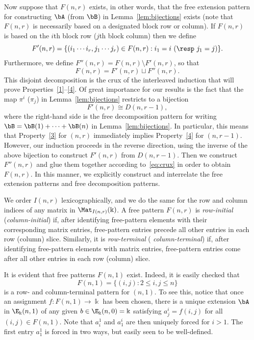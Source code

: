 Now suppose that $F(n,r)$ exists, in other words, that the free
extension pattern for constructing $\bA$ (from $\bB$) in Lemma~\ref{lem:bijections} exists (note that $F(n,r)$ is necessarily based on a designated block row or column). If $F(n,r)$ is based on the
$i$th block row (\resp $j$th block column) then we define 
\begin{equation}\label{eq:F'-def}
 F'(n,r) = \{(i_1 \cdots i_r, j_1 \cdots j_r) \in F(n,r):
 i_1 = i\ (\text{\resp}\ j_1 = j)\}.
\end{equation}
Furthermore, we define $F''(n,r)=F(n,r) \setminus F'(n,r)$, so that
\begin{equation}\label{eq:crux}
F(n,r) = F'(n,r) \sqcup F''(n,r).
\end{equation}
This disjoint decomposition is the crux of the interleaved induction
that will prove Properties~\ref{1}--\ref{4}. Of great importance for
our results is the fact that the map $\pi^i$ (\resp $\pi_j$) in Lemma~\ref{lem:bijections} restricts to a bijection
\[
F'(n,r)\cong D(n,r-1),
\]
where the right-hand side is the free decomposition pattern for writing
$\bB = \bB(1)+ \cdots + \bB(n)$ in Lemma~\ref{lem:bijections}. In
particular, this means that Property~\ref{3} for $(n,r)$ immediately
implies Property~\ref{4} for $(n,r-1)$. However, our induction
proceeds in the reverse direction, using the inverse of the above
bijection to construct $F'(n,r)$ from $D(n,r-1)$. Then we construct
$F''(n,r)$ and glue them together according to~\eqref{eq:crux} in
order to obtain $F(n,r)$. In this manner, we explicitly construct and
interrelate the free extension patterns and free decomposition
patterns.


\begin{defi}
We order $I(n,r)$ lexicographically, and we do the same
for the row and column indices of any matrix in
$\Mat_{I(n,r)}(\Bbbk)$. A free pattern $F(n,r)$ is \emph{row-initial}
(\resp \emph{column-initial}) if, after identifying free-pattern
elements with their corresponding matrix entries, free-pattern entries
precede all other entries in each row (\resp column)
slice. Similarly, it is \emph{row-terminal} (\resp
\emph{column-terminal}) if, after identifying free-pattern elements
with matrix entries, free-pattern entries come after all other entries
in each row (\resp column) slice.
\end{defi}

It is evident that free patterns $F(n,1)$ exist. Indeed, it is easily
checked that
\[
F(n,1) = \{(i,j): 2 \le i,j \le n\}
\]
is a row- and column-terminal pattern for $(n,1)$. To see this,
notice that once an assignment $f:F(n,1) \to \Bbbk$ has been chosen,
there is a unique extension $\bA$ in $\E_\Bbbk(n,1)$ of any given $b
\in \E_\Bbbk(n,0) = \Bbbk$ satisfying $a^i_j = f(i,j)$ for all $(i,j)
\in F(n,1)$. Note that $a^1_i$ and $a^i_1$ are then uniquely forced
for $ i>1 $. The first entry $a^1_1$ is forced in two ways, but
easily seen to be well-defined.

